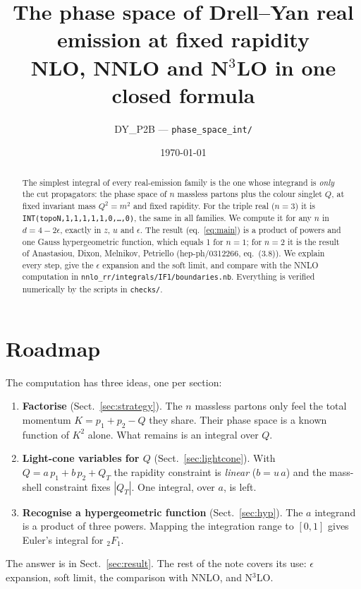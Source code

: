 \documentclass[11pt,a4paper]{article}
\title{The phase space of Drell--Yan real emission at fixed rapidity\\[2pt]
\large NLO, NNLO and N$^3$LO in one closed formula}
\author{DY\_P2B --- \texttt{phase\_space\_int/}}
\date{\today}
\newcommand{\ep}{\epsilon}
\newcommand{\F}{{}_2F_1}
\begin{document}
\maketitle

\begin{abstract}
The simplest integral of every real-emission family is the one whose integrand is \emph{only} the cut
propagators: the phase space of $n$ massless partons plus the colour singlet $Q$, at fixed invariant mass $Q^2=m^2$
and fixed rapidity. For the triple real ($n=3$) it is \texttt{INT(topoN,1,1,1,1,1,0,\dots,0)}, the same in all
families. We compute it for any $n$ in $d=4-2\ep$, exactly in $z$, $u$ and $\ep$. The result
(eq.~\eqref{eq:main}) is a product of powers and one Gauss hypergeometric function, which equals 1 for $n=1$; for
$n=2$ it is the result of Anastasiou, Dixon, Melnikov, Petriello (hep-ph/0312266, eq.~(3.8)).
We explain every step, give the $\ep$ expansion and the soft limit, and compare with the NNLO computation in
\texttt{nnlo\_rr/integrals/IF1/\allowbreak boundaries.nb}. Everything is verified numerically by the scripts in
\texttt{checks/}.
\end{abstract}

\tableofcontents

\section*{Roadmap}
The computation has three ideas, one per section:
\begin{enumerate}
\item \textbf{Factorise} (Sect.~\ref{sec:strategy}). The $n$ massless partons only feel the total momentum
  $K=p_1+p_2-Q$ they share. Their phase space is a known function of $K^2$ alone. What remains is an integral
  over $Q$.
\item \textbf{Light-cone variables for $Q$} (Sect.~\ref{sec:lightcone}). With $Q=a\,p_1+b\,p_2+Q_T$ the
  rapidity constraint is \emph{linear} ($b=u\,a$) and the mass-shell constraint fixes $|Q_T|$. One integral, over
  $a$, is left.
\item \textbf{Recognise a hypergeometric function} (Sect.~\ref{sec:hyp}). The $a$ integrand is a product of three
  powers. Mapping the integration range to $[0,1]$ gives Euler's integral for $\F$.
\end{enumerate}
The answer is in Sect.~\ref{sec:result}. The rest of the note covers its use: $\ep$ expansion, soft limit, the
comparison with NNLO, and N$^3$LO.
\end{document}
